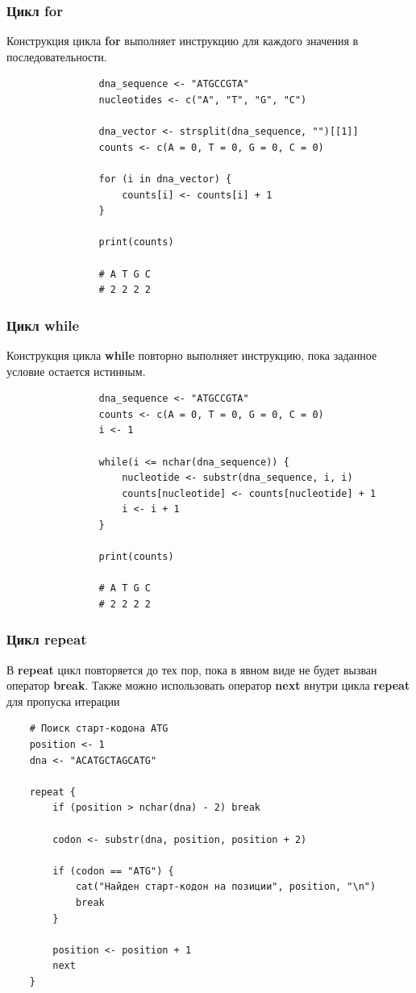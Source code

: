 \documentclass[11pt,a4paper]{beamer}
\begin{document}
	\begin{frame}[fragile]
		\frametitle{Цикл for}
		Конструкция цикла \textbf{for} выполняет инструкцию для каждого значения в последовательности. 
		{\fontsize{10}{10}\selectfont
			\begin{verbatim}
				dna_sequence <- "ATGCCGTA"
				nucleotides <- c("A", "T", "G", "C")
				
				dna_vector <- strsplit(dna_sequence, "")[[1]]
				counts <- c(A = 0, T = 0, G = 0, C = 0)
				
				for (i in dna_vector) {
				    counts[i] <- counts[i] + 1
				}
				
				print(counts)
				
				# A T G C 
				# 2 2 2 2 
			\end{verbatim}
		}
	\end{frame}
	
	\begin{frame}[fragile]
		\frametitle{Цикл while}
		 Конструкция цикла \textbf{while} повторно выполняет инструкцию, пока заданное условие остается истинным.
		{\fontsize{9}{10}\selectfont
			\begin{verbatim}
				dna_sequence <- "ATGCCGTA"
				counts <- c(A = 0, T = 0, G = 0, C = 0)
				i <- 1
				
				while(i <= nchar(dna_sequence)) {
				    nucleotide <- substr(dna_sequence, i, i)
				    counts[nucleotide] <- counts[nucleotide] + 1
				    i <- i + 1
				}
				
				print(counts)
				
				# A T G C 
				# 2 2 2 2
			\end{verbatim}
		}
	\end{frame}
	
	\begin{frame}[fragile]
		\frametitle{Цикл repeat}
		В \textbf{repeat} цикл повторяется до тех пор, пока в явном виде не будет вызван оператор \textbf{break}. Также можно использовать оператор \textbf{next} внутри цикла \textbf{repeat} для пропуска итерации
		{\fontsize{8}{9}\selectfont
			\begin{verbatim}
    # Поиск старт-кодона ATG
    position <- 1
    dna <- "ACATGCTAGCATG"
				
    repeat {
        if (position > nchar(dna) - 2) break
					
        codon <- substr(dna, position, position + 2)
					
        if (codon == "ATG") {
            cat("Найден старт-кодон на позиции", position, "\n")
            break
        }
					
        position <- position + 1
        next
    }
			\end{verbatim}
		}
	\end{frame}
	
\end{document}
